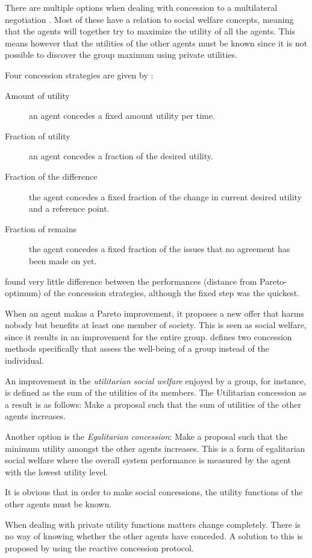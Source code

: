 There are multiple options when dealing with concession to a multilateral negotiation \citep{endriss2006monotonic}. Most of these have a relation to social welfare concepts, meaning that the agents will together try to maximize the utility of all the agents. This means however that the utilities of the other agents must be known since it is not possible to discover the group maximum using private utilities.

Four concession strategies are given by \citet{wu2009efficient}: 
\begin{description}
	\item[Amount of utility] an agent concedes a fixed amount utility per time. 
	\item[Fraction of utility] an agent concedes a fraction of the desired utility. 
	\item[Fraction of the difference] the agent concedes a fixed fraction of the change in current desired utility and a reference point. 
	\item[Fraction of remains] the agent concedes a fixed fraction of the issues that no agreement has been made on yet. \end{description} 
\citet{wu2009efficient} found very little difference between the performances (distance from Pareto-optimum) of the concession strategies, although the fixed step was the quickest. 

\begin{definition*}
	\label{def:social}
	When an agent makas a Pareto improvement, it proposes a new offer that harms nobody but benefits at least one member of society. This is seen as social welfare, since it results in an improvement for the entire group. \citet{endriss2006monotonic} defines two concession methods specifically that assess the well-being of a group instead of the individual.
	
	An improvement in the \textit{utilitarian social welfare} enjoyed by a group, for instance, is defined as the sum of the utilities of its members. The Utilitarian concession as a result is as follows: Make a proposal such that the sum of utilities of the other agents increases. 
	
	Another option is the \textit{Egalitarian concession}: Make a proposal such that the minimum utility amongst the other agents increases. This is a form of egalitarian social welfare where the overall system performance is measured by the agent with the lowest utility level.
	
	It is obvious that in order to make social concessions, the utility functions of the other agents must be known.

\end{definition*}
When dealing with private utility functions matters change completely. There is no way of knowing whether the other agents have conceded. A solution to this is proposed by \citet{zheng2015automated} using the reactive concession protocol.

